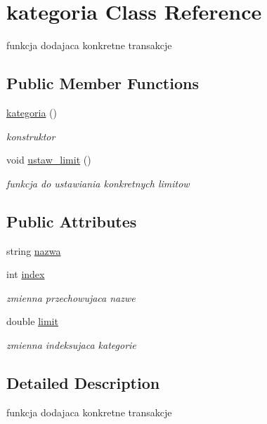 \hypertarget{classkategoria}{}\section{kategoria Class Reference}
\label{classkategoria}


funkcja dodajaca konkretne transakcje  


\subsection*{Public Member Functions}
\begin{DoxyCompactItemize}
\item 
\hyperlink{classkategoria_a53bbab616c06ae8bf3e7681786e65ed4}{kategoria} ()
\begin{DoxyCompactList}\small\item\em konstruktor \end{DoxyCompactList}\item 
void \hyperlink{classkategoria_abd82dc81f0da8fa48dc854dc3e3e3be9}{ustaw\+\_\+limit} ()
\begin{DoxyCompactList}\small\item\em funkcja do ustawiania konkretnych limitow \end{DoxyCompactList}\end{DoxyCompactItemize}
\subsection*{Public Attributes}
\begin{DoxyCompactItemize}
\item 
string \hyperlink{classkategoria_a1017c975aefe921c7fc1273b90cd8329}{nazwa}
\item 
int \hyperlink{classkategoria_a951b16b288aa128e2cd464368bedeb76}{index}
\begin{DoxyCompactList}\small\item\em zmienna przechowujaca nazwe \end{DoxyCompactList}\item 
double \hyperlink{classkategoria_a7ff01cf2eefd1320444d2582e5bd0789}{limit}
\begin{DoxyCompactList}\small\item\em zmienna indeksujaca kategorie \end{DoxyCompactList}\end{DoxyCompactItemize}


\subsection{Detailed Description}
funkcja dodajaca konkretne transakcje 

